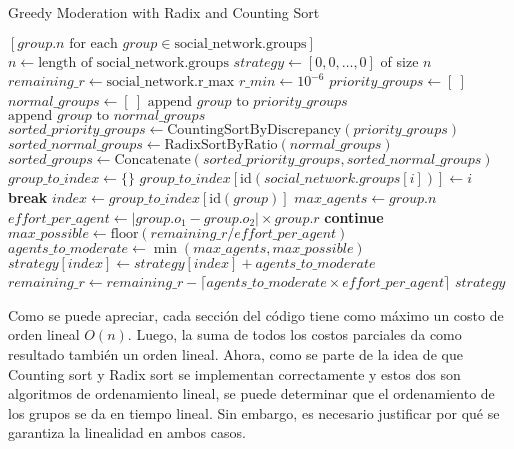 \begin{algorithm}[H]
	\caption{Greedy Moderation with Radix and Counting Sort}
	\begin{algorithmic}[1]
			\State \Return $[group.n \text{ for each } group \in \text{social\_network.groups}]$
		\EndIf
		\State $n \gets \text{length of social\_network.groups}$
		\State $strategy \gets [0, 0, \dots, 0]$ of size $n$
		\State $remaining\_r \gets \text{social\_network.r\_max}$
		\State $r\_min \gets 10^{-6}$
		\State $priority\_groups \gets [\ ]$
		\State $normal\_groups \gets [\ ]$
				\State $\text{append } group \text{ to } priority\_groups$
			\Else
				\State $ \text{append } group \text{ to } normal\_groups $
			\EndIf
		\EndFor
		\State $sorted\_priority\_groups \gets \text{CountingSortByDiscrepancy}(priority\_groups)$
		\State $sorted\_normal\_groups \gets \text{RadixSortByRatio}(normal\_groups)$
		\State $sorted\_groups \gets \text{Concatenate}(sorted\_priority\_groups, sorted\_normal\_groups)$
		\State $group\_to\_index \gets \{\}$
			\State $group\_to\_index[\text{id}(social\_network.groups[i])] \gets i$
		\EndFor
				\State \textbf{break}
			\EndIf
			\State $index \gets group\_to\_index[\text{id}(group)]$
			\State $max\_agents \gets group.n$
			\State $effort\_per\_agent \gets |group.o_1 - group.o_2| \times group.r$
				\State \textbf{continue}
			\EndIf
			\State $max\_possible \gets \text{floor}(remaining\_r / effort\_per\_agent)$
			\State $agents\_to\_moderate \gets \min(max\_agents, max\_possible)$
				\State $strategy[index] \gets strategy[index] + agents\_to\_moderate$
				\State $remaining\_r \gets remaining\_r - \lceil agents\_to\_moderate \times effort\_per\_agent \rceil$
			\EndIf
		\EndFor
		\State \Return $strategy$
	\end{algorithmic}
\end{algorithm}

Como se puede apreciar, cada sección del código tiene como máximo un costo de orden lineal $O(n)$. Luego, la suma de todos los costos parciales da como resultado también un orden lineal. Ahora, como se parte de la idea de que Counting sort y Radix sort se implementan correctamente y estos dos son algoritmos de ordenamiento lineal, se puede determinar que el ordenamiento de los grupos se da en tiempo lineal. Sin embargo, es necesario justificar por qué se garantiza la linealidad en ambos casos.

